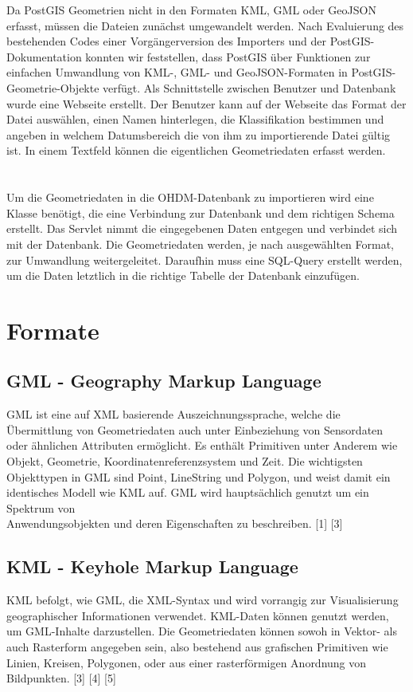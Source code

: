 \documentclass[]{article}
\begin{document}
Da PostGIS Geometrien nicht in den Formaten KML, GML oder GeoJSON erfasst, müssen die Dateien zunächst umgewandelt werden. Nach Evaluierung des bestehenden Codes einer Vorgängerversion des Importers und der PostGIS-Dokumentation konnten wir feststellen, dass PostGIS über Funktionen zur einfachen Umwandlung von KML-, GML- und GeoJSON-Formaten in PostGIS-Geometrie-Objekte verfügt. Als Schnittstelle zwischen Benutzer und Datenbank wurde eine Webseite erstellt. Der Benutzer kann auf der Webseite das Format der Datei auswählen, einen Namen hinterlegen, die Klassifikation bestimmen und angeben in welchem Datumsbereich die von ihm zu importierende Datei gültig ist. In einem Textfeld können die eigentlichen Geometriedaten erfasst werden.\\
\\
\\
Um die Geometriedaten in die OHDM-Datenbank zu importieren wird eine Klasse benötigt, die eine Verbindung zur Datenbank und dem richtigen Schema erstellt. Das Servlet nimmt die eingegebenen Daten entgegen und verbindet sich mit der Datenbank. Die Geometriedaten werden, je nach ausgewählten Format, zur Umwandlung weitergeleitet. Daraufhin muss eine SQL-Query erstellt werden, um die Daten letztlich in die richtige Tabelle der Datenbank einzufügen.

\section{Formate}
\subsection{GML - Geography Markup Language}
GML ist eine auf XML basierende Auszeichnungssprache, welche die Übermittlung von Geometriedaten auch unter Einbeziehung von Sensordaten oder ähnlichen Attributen ermöglicht. Es enthält Primitiven unter Anderem wie Objekt, Geometrie, Koordinatenreferenzsystem und Zeit. Die wichtigsten Objekttypen in GML sind Point, LineString und Polygon, und weist damit ein identisches Modell wie KML auf. GML wird hauptsächlich genutzt um ein Spektrum von \\Anwendungsobjekten und deren Eigenschaften zu beschreiben. [1] [3]

\subsection{KML - Keyhole Markup Language}
KML befolgt, wie GML, die XML-Syntax und wird vorrangig zur Visualisierung geographischer Informationen verwendet. KML-Daten können genutzt werden, um GML-Inhalte darzustellen. Die Geometriedaten können sowoh in Vektor- als auch Rasterform angegeben sein, also bestehend aus grafischen Primitiven wie Linien, Kreisen, Polygonen, oder aus einer rasterförmigen Anordnung von Bildpunkten. [3] [4] [5]
\end{document}
